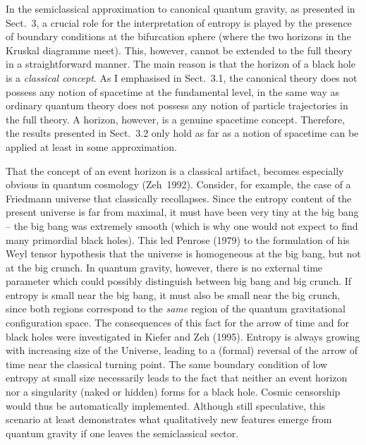 In the semiclassical approximation to canonical quantum gravity,
as presented in Sect.~3, a crucial role for the interpretation
of entropy is played by the presence of boundary conditions
at the bifurcation sphere (where the two horizons in the
Kruskal diagramme meet). This, however, cannot be extended to the
full theory in a straightforward manner. The main reason is that
the horizon of a black hole is a {\em classical concept}. As I
emphasised in Sect.~3.1, the canonical theory does not possess
any notion of spacetime at the fundamental level, in the same way
as ordinary quantum theory does not possess any notion of particle
trajectories in the full theory. A horizon, however, is a genuine
spacetime concept. Therefore, the results presented in Sect.~3.2
only hold as far as a notion of spacetime can be applied at least
in some approximation. 

That the concept of an event horizon is a classical artifact,
becomes especially obvious in quantum cosmology (Zeh~1992).
Consider, for example, the case of a Friedmann universe that
classically recollapses. Since the entropy content of the present
universe is far from maximal, it must have been very tiny at
the big bang -- the big bang was extremely smooth (which is why
one would not expect to find many primordial black holes).
 This led
Penrose (1979) to the formulation of his Weyl tensor hypothesis
that the universe is homogeneous at the big bang, but not
at the big crunch. In quantum gravity, however, 
there is no external time parameter which could possibly 
distinguish between big bang and big crunch. If entropy is small
near the big bang, it must also be small near the big crunch,
since both regions correspond to the {\em same} region of the
quantum gravitational configuration space. The consequences of 
this fact for the arrow of time and for black holes were
investigated in Kiefer and Zeh (1995). Entropy is always growing
with increasing size of the Universe, leading to a (formal)
reversal of the arrow of time near the classical turning point.
The same boundary condition of low entropy at small size
necessarily leads to the fact that neither an event horizon
nor a singularity 
(naked or hidden) forms for a black hole.
 Cosmic censorship would thus be
automatically implemented. Although still speculative, this
scenario at least demonstrates what qualitatively new features
emerge from quantum gravity if one leaves the semiclassical sector.


